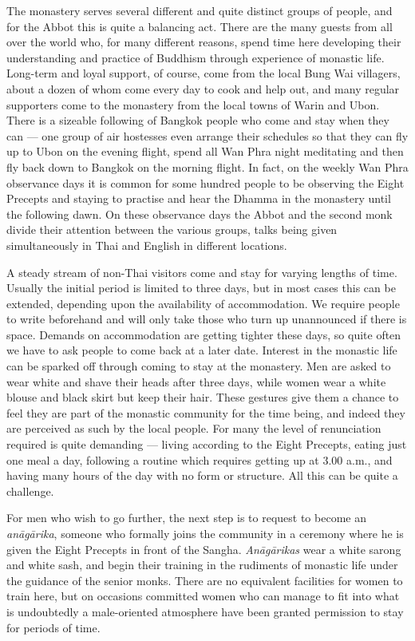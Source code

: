 The monastery serves several different and quite distinct groups of
people, and for the Abbot this is quite a balancing act. There are the
many guests from all over the world who, for many different reasons,
spend time here developing their understanding and practice of Buddhism
through experience of monastic life. Long-term and loyal support, of
course, come from the local Bung Wai villagers, about a dozen of whom
come every day to cook and help out, and many regular supporters come to
the monastery from the local towns of Warin and Ubon. There is a
sizeable following of Bangkok people who come and stay when they can ---
one group of air hostesses even arrange their schedules so that they can
fly up to Ubon on the evening flight, spend all Wan Phra night
meditating and then fly back down to Bangkok on the morning flight. In
fact, on the weekly Wan Phra observance days it is common for some
hundred people to be observing the Eight Precepts and staying to
practise and hear the Dhamma in the monastery until the following dawn.
On these observance days the Abbot and the second monk divide their
attention between the various groups, talks being given simultaneously
in Thai and English in different locations.

A steady stream of non-Thai visitors come and stay for varying lengths
of time. Usually the initial period is limited to three days, but in
most cases this can be extended, depending upon the availability of
accommodation. We require people to write beforehand and will only take
those who turn up unannounced if there is space. Demands on
accommodation are getting tighter these days, so quite often we have to
ask people to come back at a later date. Interest in the monastic life
can be sparked off through coming to stay at the monastery. Men are
asked to wear white and shave their heads after three days, while women
wear a white blouse and black skirt but keep their hair. These gestures
give them a chance to feel they are part of the monastic community for
the time being, and indeed they are perceived as such by the local
people. For many the level of renunciation required is quite demanding
--- living according to the Eight Precepts, eating just one meal a day,
following a routine which requires getting up at 3.00 a.m., and having
many hours of the day with no form or structure. All this can be quite a
challenge.

For men who wish to go further, the next step is to request to become an
\emph{anāgārika}, someone who formally joins the community in a ceremony
where he is given the Eight Precepts in front of the Sangha.
\emph{Anāgārikas} wear a white sarong and white sash, and begin their
training in the rudiments of monastic life under the guidance of the
senior monks. There are no equivalent facilities for women to train
here, but on occasions committed women who can manage to fit into what
is undoubtedly a male-oriented atmosphere have been granted permission
to stay for periods of time.

